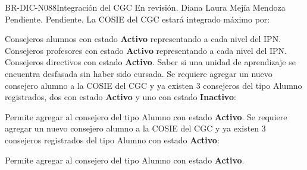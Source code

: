\begin{BusinessRule}{BR-DIC-N088}{Integración del CGC}
	{\bcDerivation} %
	{\btTimer}     %
	{\blInfluencing}     %
	\BRItem[Estado] En revisión.
	 Diana Laura Mejía Mendoza
	 Pendiente.
	 Pendiente.
	\BRItem[Descripción] La COSIE del CGC estará integrado máximo por:
	
 Consejeros alumnos con estado \textbf{Activo} representando a cada nivel del IPN.
	 Consejeros profesores con estado \textbf{Activo} representando a cada nivel del IPN.
	 Consejeros directivos con estado \textbf{Activo}.
%	
	\BRItem[Motivación] Saber si una unidad de aprendizaje se encuentra desfasada sin haber sido cursada.
		 Se requiere agregar un nuevo consejero alumno a la COSIE del CGC y ya existen 3 consejeros del tipo Alumno  registrados, dos con estado \textbf{Activo} y uno con estado \textbf{Inactivo}:
	\item Permite agregar al consejero del tipo Alumno con estado \textbf{Activo}.
		Se requiere agregar un nuevo consejero alumno a la COSIE del CGC y ya existen 3 consejeros registrados del tipo Alumno con estado \textbf{Activo}:
	\item Permite agregar al consejero del tipo Alumno con estado \textbf{Activo}.
\end{BusinessRule}

